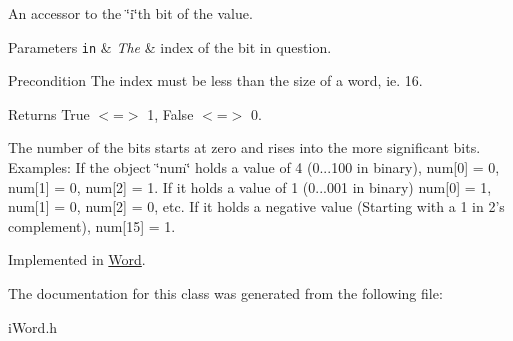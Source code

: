 An accessor to the \char`\"{}i\char`\"{}th bit of the value. 


\begin{DoxyParams}[1]{Parameters}
\mbox{\tt in}  & {\em The} & index of the bit in question. \\
\hline
\end{DoxyParams}
\begin{DoxyPrecond}{Precondition}
The index must be less than the size of a word, ie. 16. 
\end{DoxyPrecond}
\begin{DoxyReturn}{Returns}
True $<$=$>$ 1, False $<$=$>$ 0.
\end{DoxyReturn}
The number of the bits starts at zero and rises into the more significant bits. Examples: If the object \char`\"{}num\char`\"{} holds a value of 4 (0...100 in binary), num\mbox{[}0\mbox{]} = 0, num\mbox{[}1\mbox{]} = 0, num\mbox{[}2\mbox{]} = 1. If it holds a value of 1 (0...001 in binary) num\mbox{[}0\mbox{]} = 1, num\mbox{[}1\mbox{]} = 0, num\mbox{[}2\mbox{]} = 0, etc. If it holds a negative value (Starting with a 1 in 2's complement), num\mbox{[}15\mbox{]} = 1. 

Implemented in \hyperlink{classWord_ab0f10ac1a0397559b859774b503538fe}{Word}.



The documentation for this class was generated from the following file:\begin{DoxyCompactItemize}
\item 
iWord.h\end{DoxyCompactItemize}
